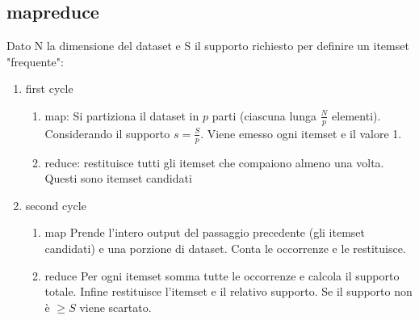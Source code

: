 \documentclass[a4paper]{report}
\begin{document}
\subsection{mapreduce}
Dato N la dimensione del dataset e S il supporto richiesto per definire un itemset "frequente":
\begin{enumerate}
\item first cycle
	\begin{enumerate}
	\item map: Si partiziona il dataset in $p$ parti (ciascuna lunga $\frac{N}{p}$ elementi). Considerando il supporto $s = \frac{S}{p}$. Viene emesso ogni itemset e il valore 1.
	\item reduce: restituisce tutti gli itemset che compaiono almeno una volta. Questi sono itemset candidati
	\end{enumerate}
\item second cycle
	\begin{enumerate}
	\item map Prende l'intero output del passaggio precedente (gli itemset candidati) e una porzione di dataset. Conta le occorrenze e le restituisce.
	\item reduce Per ogni itemset somma tutte le occorrenze e calcola il supporto totale. Infine restituisce l'itemset e il relativo supporto. Se il supporto non è $\geq S$ viene scartato.
	\end{enumerate}
\end{enumerate}
\end{document}
